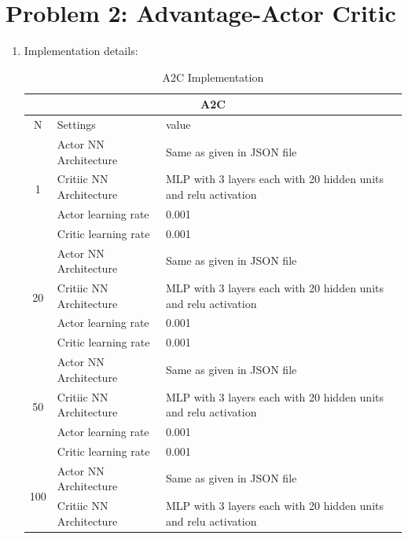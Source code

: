 \documentclass[12pt]{article}
\begin{document}
\section*{Problem 2: Advantage-Actor Critic}
\begin{enumerate}
\item Implementation details:
\begin{table}[H]
  \centering
  \caption{A2C Implementation}
    \begin{tabular}{|c|p{11.085em}|l|}
    \hline
    \multicolumn{3}{|c|}{A2C } \\
    \hline
    N     & Settings & \multicolumn{1}{p{16em}|}{value} \\
    \hline
    \multirow{4}[8]{*}{1} & Actor NN Architecture  & \multicolumn{1}{p{16em}|}{Same as given in JSON file} \\
\cline{2-3}          & Critiic NN Architecture  & \multicolumn{1}{p{16em}|}{MLP with 3 layers each with 20 hidden units and relu activation} \\
\cline{2-3}          & Actor learning rate & 0.001 \\
\cline{2-3}          & Critic learning rate & 0.001 \\
    \hline
    \multirow{4}[8]{*}{20} & Actor NN Architecture  & \multicolumn{1}{p{16em}|}{Same as given in JSON file} \\
\cline{2-3}          & Critiic NN Architecture  & \multicolumn{1}{p{16em}|}{MLP with 3 layers each with 20 hidden units and relu activation} \\
\cline{2-3}          & Actor learning rate & 0.001 \\
\cline{2-3}          & Critic learning rate & 0.001 \\
    \hline
    \multirow{4}[8]{*}{50} & Actor NN Architecture  & \multicolumn{1}{p{16em}|}{Same as given in JSON file} \\
\cline{2-3}          & Critiic NN Architecture  & \multicolumn{1}{p{16em}|}{MLP with 3 layers each with 20 hidden units and relu activation} \\
\cline{2-3}          & Actor learning rate & 0.001 \\
\cline{2-3}          & Critic learning rate & 0.001 \\
    \hline
    \multirow{4}[7]{*}{100} & Actor NN Architecture  & \multicolumn{1}{p{16em}|}{Same as given in JSON file} \\
\cline{2-3}          & Critiic NN Architecture  & \multicolumn{1}{p{16em}|}{MLP with 3 layers each with 20 hidden units and relu activation} \\

\end{tabular}
\end{table}
\end{enumerate}
\end{document}
